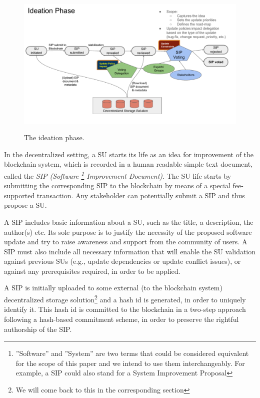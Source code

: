 \begin{figure}[H]
    \caption{The ideation phase.}
    \centering
    \includegraphics[width=0.9 \columnwidth,keepaspectratio]{figures/ideation_phase.pdf}
    \label{ideation}
\end{figure}

In the decentralized setting, a SU starts its life as an idea for improvement of the blockchain system, which is recorded in a human readable simple text document, called the \emph{SIP (Software  \footnote{''Software'' and ''System'' are two terms that could be considered equivalent for the scope of this paper and we intend to use them interchangeably. For example, a SIP could also stand for a System Improvement Proposal} Improvement Document)}. The SU life starts by submitting the corresponding SIP to the blockchain by means of a special fee-supported transaction. Any stakeholder can potentially submit a SIP and thus propose a SU. 

A SIP includes basic information about a SU, such as the title, a description, the author(s) etc. Its sole purpose is to justify the necessity of the proposed software update and try to raise awareness and support from the community of users. A SIP must also include all necessary information that will enable the SU validation against previous SUs (e.g., update dependencies or update conflict issues), or against any prerequisites required, in order to be applied.

A SIP is initially uploaded to some external (to the blockchain system) decentralized storage solution\footnote{We will come back to this in the corresponding section} and a hash id is generated, in order to uniquely identify it. This hash id is committed to the blockchain in a two-step approach following a hash-based commitment scheme, in order to preserve the rightful authorship of the SIP.

